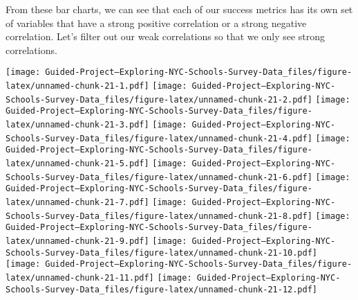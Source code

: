 \documentclass[]{article}
\newenvironment{Shaded}{\begin{snugshade}}{\end{snugshade}}
\newcommand{\ControlFlowTok}[1]{\textcolor[rgb]{0.13,0.29,0.53}{\textbf{#1}}}
\newcommand{\DataTypeTok}[1]{\textcolor[rgb]{0.13,0.29,0.53}{#1}}
\newcommand{\KeywordTok}[1]{\textcolor[rgb]{0.13,0.29,0.53}{\textbf{#1}}}
\newcommand{\NormalTok}[1]{#1}
\newcommand{\OperatorTok}[1]{\textcolor[rgb]{0.81,0.36,0.00}{\textbf{#1}}}
\newcommand{\StringTok}[1]{\textcolor[rgb]{0.31,0.60,0.02}{#1}}
\begin{document}
From these bar charts, we can see that each of our success metrics has
its own set of variables that have a strong positive correlation or a
strong negative correlation. Let's filter out our weak correlations so
that we only see strong correlations.

\begin{Shaded}
\end{Shaded}

\texttt{[image: Guided-Project--Exploring-NYC-Schools-Survey-Data\_files/figure-latex/unnamed-chunk-21-1.pdf]}
\texttt{[image: Guided-Project--Exploring-NYC-Schools-Survey-Data\_files/figure-latex/unnamed-chunk-21-2.pdf]}
\texttt{[image: Guided-Project--Exploring-NYC-Schools-Survey-Data\_files/figure-latex/unnamed-chunk-21-3.pdf]}
\texttt{[image: Guided-Project--Exploring-NYC-Schools-Survey-Data\_files/figure-latex/unnamed-chunk-21-4.pdf]}
\texttt{[image: Guided-Project--Exploring-NYC-Schools-Survey-Data\_files/figure-latex/unnamed-chunk-21-5.pdf]}
\texttt{[image: Guided-Project--Exploring-NYC-Schools-Survey-Data\_files/figure-latex/unnamed-chunk-21-6.pdf]}
\texttt{[image: Guided-Project--Exploring-NYC-Schools-Survey-Data\_files/figure-latex/unnamed-chunk-21-7.pdf]}
\texttt{[image: Guided-Project--Exploring-NYC-Schools-Survey-Data\_files/figure-latex/unnamed-chunk-21-8.pdf]}
\texttt{[image: Guided-Project--Exploring-NYC-Schools-Survey-Data\_files/figure-latex/unnamed-chunk-21-9.pdf]}
\texttt{[image: Guided-Project--Exploring-NYC-Schools-Survey-Data\_files/figure-latex/unnamed-chunk-21-10.pdf]}
\texttt{[image: Guided-Project--Exploring-NYC-Schools-Survey-Data\_files/figure-latex/unnamed-chunk-21-11.pdf]}
\texttt{[image: Guided-Project--Exploring-NYC-Schools-Survey-Data\_files/figure-latex/unnamed-chunk-21-12.pdf]}
\end{document}
